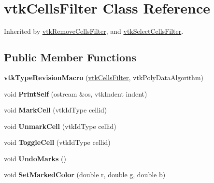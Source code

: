 \hypertarget{classvtkCellsFilter}{
\section{vtkCellsFilter Class Reference}
\label{classvtkCellsFilter}
}


Inherited by \hyperlink{classvtkRemoveCellsFilter}{vtkRemoveCellsFilter}, and \hyperlink{classvtkSelectCellsFilter}{vtkSelectCellsFilter}.

\subsection*{Public Member Functions}
\begin{DoxyCompactItemize}
\item 
\hypertarget{classvtkCellsFilter_afcdc6df60fa20c76231f906bec08b927}{
{\bfseries vtkTypeRevisionMacro} (\hyperlink{classvtkCellsFilter}{vtkCellsFilter}, vtkPolyDataAlgorithm)}
\label{classvtkCellsFilter_afcdc6df60fa20c76231f906bec08b927}

\item 
\hypertarget{classvtkCellsFilter_aa9bc8fe52147217ca9d38d3d2d8757fe}{
void {\bfseries PrintSelf} (ostream \&os, vtkIndent indent)}
\label{classvtkCellsFilter_aa9bc8fe52147217ca9d38d3d2d8757fe}

\item 
\hypertarget{classvtkCellsFilter_ae2e35f27ef3dcffaec928132cef2a53d}{
void {\bfseries MarkCell} (vtkIdType cellid)}
\label{classvtkCellsFilter_ae2e35f27ef3dcffaec928132cef2a53d}

\item 
\hypertarget{classvtkCellsFilter_ac37c9a09305ab9283da51025e55d032c}{
void {\bfseries UnmarkCell} (vtkIdType cellid)}
\label{classvtkCellsFilter_ac37c9a09305ab9283da51025e55d032c}

\item 
\hypertarget{classvtkCellsFilter_a9baa86f2381eca30817bf1d84926255b}{
void {\bfseries ToggleCell} (vtkIdType cellid)}
\label{classvtkCellsFilter_a9baa86f2381eca30817bf1d84926255b}

\item 
\hypertarget{classvtkCellsFilter_a95fc0b0d36f7287ce9575a4a54ef5c58}{
void {\bfseries UndoMarks} ()}
\label{classvtkCellsFilter_a95fc0b0d36f7287ce9575a4a54ef5c58}

\item 
\hypertarget{classvtkCellsFilter_a988af256db7b304b5792bb506f04732c}{
void {\bfseries SetMarkedColor} (double r, double g, double b)}
\label{classvtkCellsFilter_a988af256db7b304b5792bb506f04732c}


\end{DoxyCompactItemize}
